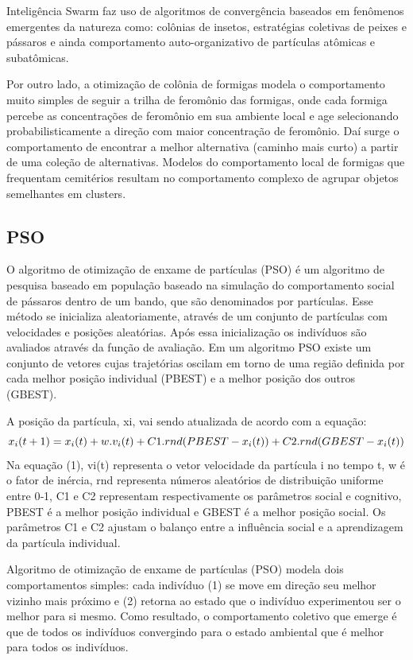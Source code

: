 \documentclass[10pt]{article}
\begin{document}
Inteligência Swarm faz uso de algoritmos de convergência baseados em fenômenos emergentes da natureza como: colônias de insetos, estratégias coletivas de peixes e pássaros e ainda comportamento auto-organizativo de partículas atômicas e subatômicas.

Por outro lado, a otimização de colônia de formigas modela o comportamento muito simples de seguir a trilha de feromônio das formigas, onde cada formiga percebe as concentrações de feromônio em sua
ambiente local e age selecionando probabilisticamente a direção com maior
concentração de feromônio. Daí surge o comportamento de encontrar a melhor alternativa (caminho mais curto) a partir de uma coleção de alternativas. Modelos do comportamento local de
formigas que frequentam cemitérios resultam no comportamento complexo de agrupar objetos semelhantes
em clusters.

\subsection{PSO}\label{sec:PSO}
O algoritmo de otimização de enxame de partículas (PSO) é um algoritmo de pesquisa baseado em população baseado na simulação do comportamento social de pássaros dentro de um bando, que são denominados por partículas. Esse método se inicializa aleatoriamente, através de um conjunto de partículas com velocidades e posições aleatórias. Após essa inicialização os indivíduos são avaliados através da função de avaliação. Em um algoritmo PSO existe um conjunto de vetores cujas trajetórias oscilam em torno de uma região definida por cada melhor posição individual (PBEST) e a melhor posição dos outros (GBEST).

A posição da partícula, xi, vai sendo atualizada de acordo com a equação:
\begin{equation}
  \vspace{1cm}
    x_i (t+1) = x_i (t) + w.v_i(t) + C1.rnd(PBEST ‐ x_i (t)) + C2.rnd(GBEST ‐ x_i (t))
\end{equation}
Na equação (1), vi(t) representa o vetor velocidade da partícula i no tempo t, w é o fator de inércia, rnd representa números aleatórios de distribuição uniforme entre 0‐1, C1 e C2 representam respectivamente os parâmetros social e cognitivo, PBEST é a melhor posição individual e GBEST é a melhor posição social. Os parâmetros C1 e C2 ajustam o balanço entre a influência social e a aprendizagem da partícula individual.

Algoritmo de otimização de enxame de partículas (PSO) modela dois comportamentos simples:  cada indivíduo (1) se move em direção seu melhor vizinho mais próximo e  (2) retorna ao estado que o indivíduo experimentou ser o melhor para si mesmo. Como resultado, o comportamento coletivo que emerge é que
de todos os indivíduos convergindo para o estado ambiental que é melhor para todos os indivíduos.
\end{document}
